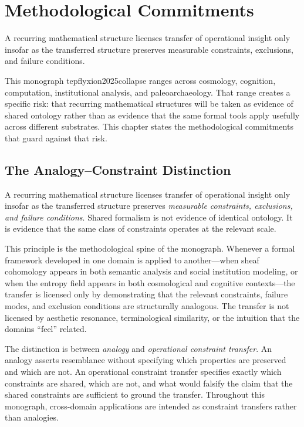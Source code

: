 \chapter*{Methodological Commitments}
\label{ch:method_commitments}

\epigraph{A recurring mathematical structure licenses transfer of operational insight
only insofar as the transferred structure preserves measurable constraints, exclusions,
and failure conditions.}{}

\noindent This monograph 	tep{flyxion2025collapse} ranges across cosmology, cognition, computation, institutional
analysis, and paleoarchaeology. That range creates a specific risk: that recurring
mathematical structures will be taken as evidence of shared ontology rather than as
evidence that the same formal tools apply usefully across different substrates. This
chapter states the methodological commitments that guard against that risk.

\section*{The Analogy--Constraint Distinction}

\begin{firewall}
A recurring mathematical structure licenses transfer of operational insight only
insofar as the transferred structure preserves \emph{measurable constraints,
exclusions, and failure conditions}. Shared formalism is not evidence of identical
ontology. It is evidence that the same class of constraints operates at the relevant
scale.
\end{firewall}

This principle is the methodological spine of the monograph. Whenever a formal
framework developed in one domain is applied to another---when sheaf cohomology
appears in both semantic analysis and social institution modeling, or when the
\RSVP entropy field appears in both cosmological and cognitive contexts---the transfer
is licensed only by demonstrating that the relevant constraints, failure modes, and
exclusion conditions are structurally analogous. The transfer is not licensed by
aesthetic resonance, terminological similarity, or the intuition that the domains
``feel'' related.

The distinction is between \emph{analogy} and \emph{operational constraint transfer}.
An analogy asserts resemblance without specifying which properties are preserved and
which are not. An operational constraint transfer specifies exactly which constraints
are shared, which are not, and what would falsify the claim that the shared constraints
are sufficient to ground the transfer. Throughout this monograph, cross-domain
applications are intended as constraint transfers rather than analogies.

